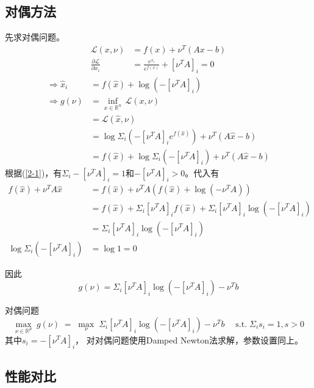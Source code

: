 \documentclass{homework}
\begin{document}
\begin{sol}
\subsection*{对偶方法}先求对偶问题。
\begin{equation}\label{2-1}
\begin{aligned}
    \mathcal L(x,\nu) &=  f(x) + \nu^T(Ax-b) \\
    \frac{\partial \mathcal L}{\partial x_i}  &= \frac{e^{x_i}}{e^{f(x)}} + [\nu^TA]_i = 0 
    \end{aligned}
\end{equation}
\begin{equation}
    \begin{aligned}
    \Rightarrow \hat x_i &= f(\hat x) + \log(-[\nu^TA]_i) \\
    \Rightarrow g(\nu) &= \inf_{x\in\mathbb{R}^n}\,\mathcal L(x,\nu) \\
    &= \mathcal L(\hat x,\nu) \\
    &= \log \Sigma_i (-[\nu^TA]_ie^{f(\hat x)}) + \nu^T(A\hat x -b) \\
    & = f(\hat x) + \log\Sigma_i(-[\nu^TA]_i) + \nu^T(A\hat x -b)
\end{aligned}   
\end{equation}
根据(\ref{2-1})，有$\Sigma_i -[\nu^TA]_i = 1$和$-[\nu^TA]_i > 0$。代入有
\begin{equation}
    \begin{aligned}
        f(\hat x) + \nu^TA\hat x & = f(\hat x) + \nu^TA(f(\hat x) + \log (-\nu^TA)) \\&= f(\hat x) + \Sigma_i [\nu^TA]_i f(\hat x) + \Sigma_i[\nu^TA]_i\log(-[\nu^TA]_i) \\&= \Sigma_i[\nu^TA]_i\log(-[\nu^TA]_i) \\
        \log\Sigma_i(-[\nu^TA]_i) &= \log 1 = 0
    \end{aligned}
\end{equation}

因此
\[
g(\nu) = \Sigma_i[\nu^TA]_i\log(-[\nu^TA]_i) - \nu^Tb
\]

对偶问题
\[
\max_{\nu\in\mathbb{R}^p}\;g(\nu)
\;=\;
\max_{\nu}\;
\Sigma_i[\nu^TA]_i\log(-[\nu^TA]_i) - \nu^Tb \quad\;\text{s.t.} \;\Sigma_i s_i = 1, s >0
\]
其中$s_i = -[\nu^TA]_i$，
对对偶问题使用Damped Newton法求解，参数设置同上。

\subsection*{性能对比}


\end{sol}
\end{document}

